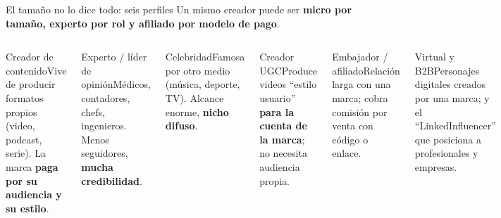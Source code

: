 \documentclass[aspectratio=169,xcolor=dvipsnames]{beamer}
\begin{document}
\begin{frame}{El tamaño no lo dice todo: seis perfiles}
\centering\scriptsize Un mismo creador puede ser \textbf{micro por tamaño, experto por rol y afiliado por modelo de pago}.\par\vspace{3pt}
\raggedright
\begin{columns}[T]
  \begin{block}{Creador de contenido}\scriptsize Vive de producir formatos propios (video, podcast, serie). La marca \textbf{paga por su audiencia y su estilo}.\end{block}
  \begin{block}{Experto / líder de opinión}\scriptsize Médicos, contadores, chefs, ingenieros. Menos seguidores, \textbf{mucha credibilidad}.\end{block}
  \begin{block}{Celebridad}\scriptsize Famosa por otro medio (música, deporte, TV). Alcance enorme, \textbf{nicho difuso}.\end{block}
  \begin{exampleblock}{Creador UGC\footnotemark}\scriptsize Produce videos \enquote{estilo usuario} \textbf{para la cuenta de la marca}; no necesita audiencia propia.\end{exampleblock}
  \begin{block}{Embajador / afiliado}\scriptsize Relación larga con una marca; cobra comisión por venta con código o enlace.\end{block}
  \begin{alertblock}{Virtual y B2B}\scriptsize Personajes digitales creados por una marca; y el \enquote{LinkedInfluencer} que posiciona a profesionales y empresas.\end{alertblock}
\end{columns}
\vspace{2pt}
\end{frame}
\end{document}
